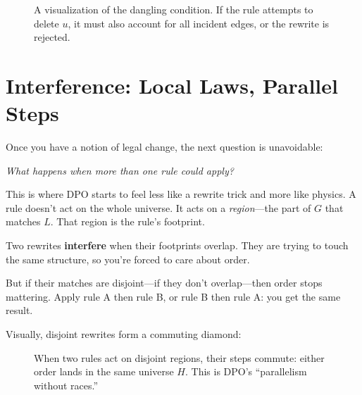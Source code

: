 \begin{figure}[h]
    \centering
    \caption{A visualization of the dangling condition. If the rule attempts to delete $u$, it must also account for all incident edges, or the rewrite is rejected.}
    \label{fig:dangling-visual}
\end{figure}

\section{Interference: Local Laws, Parallel Steps}
\label{sec:interference}

Once you have a notion of legal change, the next question is unavoidable:

\textit{What happens when more than one rule could apply?}

This is where DPO starts to feel less like a rewrite trick and more like physics.
A rule doesn't act on the whole universe. It acts on a \emph{region}---the part of $G$ that matches $L$. That region is the rule's footprint.

Two rewrites \textbf{interfere} when their footprints overlap.
They are trying to touch the same structure, so you're forced to care about order.

But if their matches are disjoint---if they don't overlap---then order stops mattering. Apply rule A then rule B, or rule B then rule A: you get the same result.

Visually, disjoint rewrites form a commuting diamond:

\begin{figure}[h]
    \centering
    \caption{When two rules act on disjoint regions, their steps commute: either order lands in the same universe $H$. This is DPO's ``parallelism without races.''}
    \label{fig:dpo-commutation}
\end{figure}


